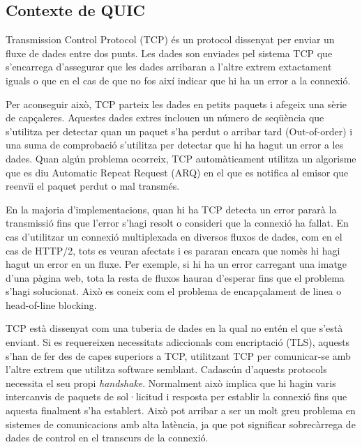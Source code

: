 \subsection{Contexte de QUIC}
{
    Transmission Control Protocol (TCP) és un protocol dissenyat per enviar un fluxe de dades entre dos punts. Les dades son enviades
    pel sistema TCP que s'encarrega d'assegurar que les dades arribaran a l'altre extrem extactament iguals o que en el cas de que no
    fos així indicar que hi ha un error a la connexió.

    Per aconseguir això, TCP parteix les dades en petits paquets i afegeix una sèrie de capçaleres. Aquestes dades extres inclouen un 
    número de seqüència que s'utilitza per detectar quan un paquet s'ha perdut o arribar tard (Out-of-order) i una suma de comprobació
    s'utilitza per detectar que hi ha hagut un error a les dades. Quan algún problema ocorreix, TCP automàticament utilitza un algorisme
    que es diu Automatic Repeat Request (ARQ) en el que es notifica al emisor que reenvïi el paquet perdut o mal transmés.

    En la majoria d'implementacions, quan hi ha TCP detecta un error pararà la transmissió fins que l'error s'hagi resolt o consideri
    que la connexió ha fallat. En cas d'utilitzar un connexió multiplexada en diversos fluxos de dades, com en el cas de HTTP/2, tots
    es veuran afectats i es pararan encara que nomès hi hagi hagut un error en un fluxe. Per exemple, si hi ha un error carregant una
    imatge d'una pàgina web, tota la resta de fluxos hauran d'esperar fins que el problema s'hagi solucionat. Això es coneix com el 
    problema de encapçalament de linea o head-of-line blocking.

    TCP està dissenyat com una tuberia de dades en la qual no entén el que s'està enviant. Si es requereixen necessitats adiccionals 
    com encriptació (TLS), aquests s'han de fer des de capes superiors a TCP, utilitzant TCP per comunicar-se amb l'altre extrem 
    que utilitza software semblant. Cadascún d'aquests protocols necessita el seu propi \textit{handshake}. Normalment això implica
    que hi hagin varis intercanvis de paquets de sol·licitud i resposta per establir la connexió fins que aquesta finalment s'ha
    establert. Això pot arribar a ser un molt greu problema en sistemes de comunicacions amb alta latència, ja que pot significar
    sobrecàrrega de dades de control en el transcurs de la connexió.
}

